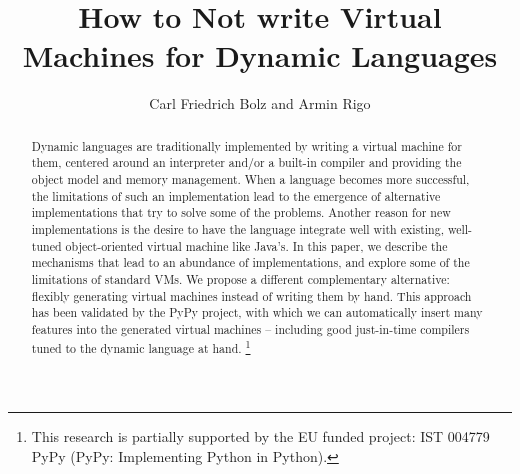 \documentclass{llncs}
\begin{document}
\pagestyle{headings}

\title{How to Not write Virtual Machines for Dynamic Languages}


\author{Carl Friedrich Bolz and Armin Rigo}




\maketitle

\begin{abstract}

Dynamic languages are traditionally implemented by writing a virtual
machine for them, centered around an interpreter and/or a built-in
compiler and providing the object model and memory management. When
a language becomes more successful, the limitations of such an implementation
lead to the emergence of alternative implementations that try to solve some
of the problems. Another reason for new implementations is the desire to have
the language integrate well with existing, well-tuned object-oriented virtual
machine like Java's. In this paper, we describe the mechanisms that lead to an
abundance of implementations, and explore some of the limitations of standard
VMs.  We propose a different complementary alternative: flexibly generating
virtual machines instead
of writing them by hand.  This approach has been validated by the PyPy
project, with which we can automatically insert many features into the
generated virtual machines – including good just-in-time compilers tuned
to the dynamic language at hand.
\footnote{This research is partially supported by the EU funded %
 project:
IST 004779 PyPy (PyPy: Implementing Python in Python).} \\

\end{abstract}
\end{document}
